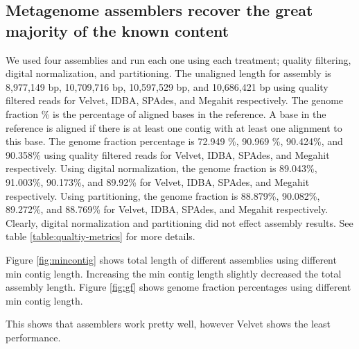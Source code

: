 \subsection*{Metagenome assemblers recover the great majority of the known content}   
We  used four assemblies and run each one using each treatment; quality filtering, digital normalization, and partitioning. 
The unaligned length for assembly is 8,977,149 bp, 10,709,716 bp,  10,597,529 bp, and 10,686,421 bp using quality filtered reads for Velvet, IDBA, SPAdes, and Megahit respectively. 
The genome fraction \% is the percentage of aligned bases in the reference. A base in the reference is aligned if there is at least one contig with at least one alignment to this base. 
The genome fraction percentage is 72.949 \%, 90.969 \%, 90.424\%, and 90.358\%  using quality filtered reads for Velvet, IDBA, SPAdes, and Megahit respectively. 
Using digital normalization, the genome fraction is 89.043\%, 91.003\%, 90.173\%, and 89.92\% for Velvet, IDBA, SPAdes, and Megahit respectively. 
Using partitioning, the genome fraction is 88.879\%, 90.082\%, 89.272\%, and 88.769\% for Velvet, IDBA, SPAdes, and Megahit respectively.  Clearly, digital normalization and partitioning did not effect assembly results. See table \ref{table:qualtiy-metrics} for more details.

Figure \ref{fig:mincontig} shows total length of different assemblies using different min contig length. Increasing the min contig length slightly decreased the total assembly length. 
Figure \ref{fig:gf} shows genome fraction percentages using different min contig length. 


This shows that assemblers work pretty well, however Velvet shows the least performance. 
